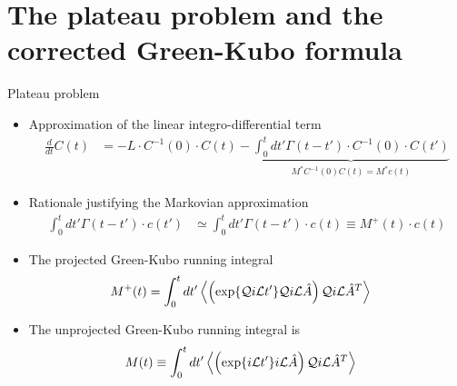 \documentclass{beamer}
\newcommand{\esc}{\!\cdot\!}
\newcommand{\llangle}{\left\langle}
\newcommand{\rrangle}{\right\rangle}
\begin{document}
\section{The plateau problem and the corrected Green-Kubo formula}
\begin{frame}{Plateau problem}
  \begin{itemize}
    \item Approximation of the linear integro-differential term 
      \begin{align}
  \frac{d}{dt}C(t)&=-L\esc C^{-1}(0)\esc C(t)
        -\underbrace{\int_0^tdt' \Gamma(t-t')\esc C^{-1}(0)\esc  C(t')}_{M^* C^{-1}(0)C(t)=M^*c(t)}
\nonumber
\end{align}
\item Rationale justifying the Markovian approximation 
\begin{align}
  \int_0^tdt' \Gamma(t-t')\esc c(t')&\simeq  \int_0^tdt' \Gamma(t-t')\esc  c(t)
\equiv
M^+(t)\esc c(t)
\nonumber
\end{align}
\item The \alert{projected} Green-Kubo running integral
\begin{align}
M^+(t)
& =\int_0^tdt' \llangle \left(\exp\{{\cal Q}i{\cal   L}t'\}{\cal Q}i{\cal L}\hat{A} \right){\cal Q} i{\cal L}\hat{A}^T\rrangle 
\nonumber
\end{align}
\item The \alert{unprojected} Green-Kubo running integral is
\begin{align}
M(t)&\equiv  \int_0^{t} dt' \llangle \left(\exp\{i{\cal   L}t'\}i{\cal L}\hat{A} \right){\cal Q} i{\cal L}\hat{A}^T\rrangle
\nonumber
\end{align}
\end{itemize}
\end{frame}
\end{document}

